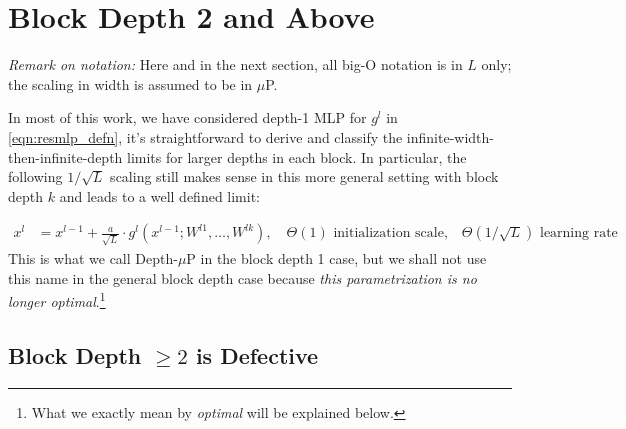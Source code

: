 \documentclass{article}
\theoremstyle{plain}
\theoremstyle{definition}
\begin{document}
 
\clearpage{}%
\section{Block Depth 2 and Above}

\label{sec:bd2}

\emph{Remark on notation:} Here and in the next section, all big-O notation is in $L$ only; the scaling in width is assumed to be in $\mu$P.

In most of this work, we have considered depth-1 MLP for $g^l$ in \cref{eqn:resmlp_defn}, it's straightforward to derive and classify the infinite-width-then-infinite-depth limits for larger depths in each block.
In particular, the following $1/\sqrt{L}$ scaling still makes sense in this more general setting with block depth $k$ and leads to a well defined limit:

    \begin{align}
        x^{l}&=x^{l-1} +\frac a {\sqrt L} \cdot g^l(x^{l-1}; W^{l1}, \ldots, W^{lk}),\quad\text{$\Theta(1)$ initialization scale,}\quad\text{$\Theta(1/\sqrt L)$ learning rate}
    \end{align}
This is what we call Depth-$\mu$P in the block depth 1 case, but we shall not use this name in the general block depth case because \emph{this parametrization is no longer optimal}.\footnote{What we exactly mean by \emph{optimal} will be explained below.}

\subsection{Block Depth $\ge 2$ is Defective}
\end{document}
